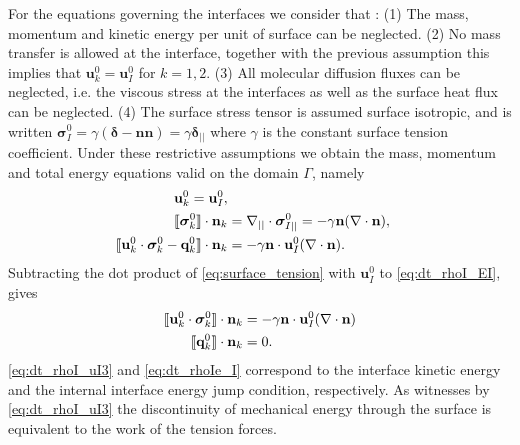 
For the equations governing the interfaces we consider that :
(1) The mass, momentum and kinetic energy per unit of surface can be neglected.
(2) No mass transfer is allowed at the interface, together with the previous assumption this implies that $\textbf{u}_k^0 = \textbf{u}_I^0$ for $k = 1,2$. 
(3) All molecular diffusion fluxes can be neglected, i.e. the viscous stress at the interfaces as well as the surface heat flux can be neglected.
(4) The surface stress tensor is assumed surface isotropic, and is written $\bm{\sigma}_I^0  = \gamma (\bm\delta - \textbf{nn}) = \gamma \bm\delta_{||}$ where $\gamma$ is the constant surface tension coefficient.
Under these restrictive assumptions we obtain the mass, momentum and total energy equations valid on the domain $\Gamma$, namely
\begin{align}
    \label{eq:dt_rho_I}
    \textbf{u}_k^0 = \textbf{u}_I^0, \\
    \llbracket \bm{\sigma}_k^0 \rrbracket \cdot \textbf{n}_k 
    &=
    \mathbf{\nabla}_{||}\cdot\bm\sigma^0_{I||}
    =
    -\gamma\textbf{n}(\mathbf{\nabla}\cdot \textbf{n}),
    \label{eq:surface_tension}\\
    \label{eq:dt_rhoI_EI}
    \llbracket \textbf{u}_k^0 \cdot \bm{\sigma}_k^0 - \textbf{q}_k^0 \rrbracket \cdot \textbf{n}_k
    &=
    -\gamma\textbf{n}\cdot \textbf{u}_{I}^0(\mathbf{\nabla}\cdot \textbf{n}).
\end{align}
Subtracting the dot product of \ref{eq:surface_tension} with $\textbf{u}_I^0$ to \ref{eq:dt_rhoI_EI}, gives 
\begin{align}
    \label{eq:dt_rhoI_uI3}
    \llbracket \textbf{u}_k^0 \cdot \bm{\sigma}_k^0 \rrbracket \cdot \textbf{n}_k
    &=
    -\gamma\textbf{n}\cdot \textbf{u}_{I}^0(\mathbf{\nabla}\cdot \textbf{n})\\
    \label{eq:dt_rhoIe_I}
    \llbracket  \textbf{q}_k^0 \rrbracket \cdot \textbf{n}_k
    &= 
     0.
\end{align}
\ref{eq:dt_rhoI_uI3} and \ref{eq:dt_rhoIe_I} correspond to the interface kinetic energy and the internal interface energy jump condition, respectively. 
As witnesses by \ref{eq:dt_rhoI_uI3} the discontinuity of mechanical energy through the surface is equivalent to the work of the tension forces. 